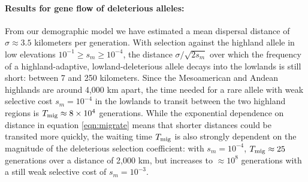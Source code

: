 \paragraph{Results for gene flow of deleterious alleles:}
From our demographic model we have estimated a mean dispersal distance of $\sigma \approx 3.5$ kilometers per generation.
With selection against the highland allele in low elevations $10^{-1} \ge s_m \ge 10^{-4}$, 
the distance $\sigma/\sqrt{2s_m}$ over which the frequency of a highland-adaptive, lowland-deleterious allele decays into the lowlands is still short: 
between 7 and 250 kilometers.
Since the Mesoamerican and Andean highlands are around 4,000 km apart, 
the time needed for a rare allele with weak selective cost $s_m=10^{-4}$ in the lowlands 
to transit between the two highland regions is $T_{\text{mig}} \approx 8 \times 10^{4}$ generations. 
While the exponential dependence on distance in equation \eqref{eqn:migrate} means that shorter distances could be transited more quickly, the waiting time $T_{\text{mig}}$ is also strongly dependent on the magnitude of the deleterious selection coefficient: with $s_m=10^{-4}$, $T_{\text{mig}} \approx 25$ generations over a distance of 2,000 km, but increases to $\approx 10^{8}$ generations with a still weak selective cost of $s_m=10^{-3}$.





\newpage


